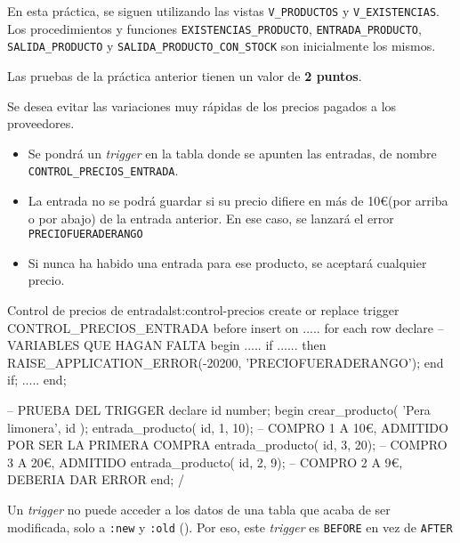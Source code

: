 En esta práctica, se siguen utilizando las vistas \texttt{V\_PRODUCTOS} y \texttt{V\_EXISTENCIAS}. Los procedimientos y funciones \texttt{EXISTENCIAS\_PRODUCTO}, \texttt{ENTRADA\_PRODUCTO}, \texttt{SALIDA\_PRODUCTO} y \texttt{SALIDA\_PRODUCTO\_CON\_STOCK} son inicialmente los mismos.



Las pruebas de la práctica anterior tienen un valor de \textbf{2 puntos}.

\newpage

\begin{homeworkProblem}

  Se desea evitar las variaciones muy rápidas de los precios pagados a los proveedores.
  \begin{itemize}
  \item Se pondrá un \textit{trigger} en la tabla donde se apunten las entradas, de nombre \texttt{CONTROL\_PRECIOS\_ENTRADA}.
  \item La entrada  no se podrá guardar si su precio difiere en más de 10\euro (por arriba o por abajo) de la entrada anterior. En ese caso, se lanzará el error \texttt{PRECIOFUERADERANGO}
  \item Si nunca ha habido una entrada para ese producto, se aceptará cualquier precio.
  \end{itemize}

\begin{listadosql}{Control de precios de entrada}{lst:control-precios}
create or replace trigger CONTROL_PRECIOS_ENTRADA
before insert on .....
for each row 
declare
  -- VARIABLES QUE HAGAN FALTA
begin
  .....
  if ...... then
    RAISE_APPLICATION_ERROR(-20200, 'PRECIOFUERADERANGO');
  end if;
.....
end;

-- PRUEBA DEL TRIGGER
declare
  id number;
begin
  crear_producto( 'Pera limonera', id );
  entrada_producto( id, 1, 10); -- COMPRO 1 A 10€, ADMITIDO POR SER LA PRIMERA COMPRA
  entrada_producto( id, 3, 20); -- COMPRO 3 A 20€, ADMITIDO
  entrada_producto( id, 2, 9); -- COMPRO 2 A 9€, DEBERIA DAR ERROR
end;
/
\end{listadosql}  

  \begin{Aviso}
    Un \textit{trigger} no puede acceder a los datos de una tabla que acaba de ser modificada, solo a \texttt{:new} y \texttt{:old} (). Por eso, este \textit{trigger} es \texttt{BEFORE} en vez de \texttt{AFTER}
  \end{Aviso}


\end{homeworkProblem}

